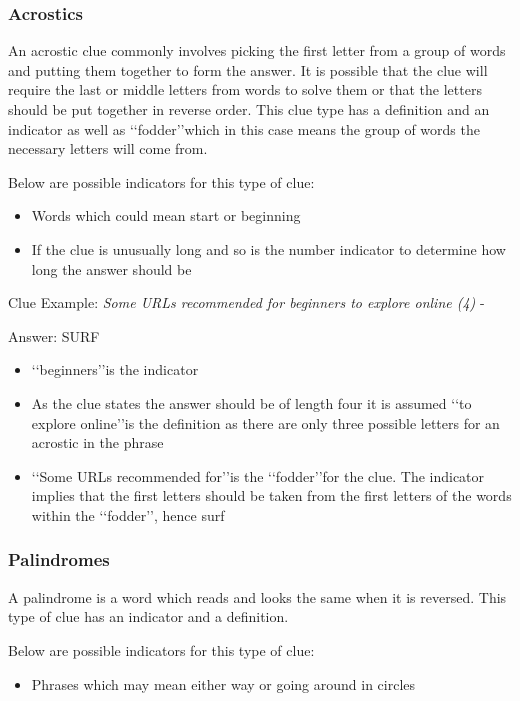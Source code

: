 \subsubsection{Acrostics}

An acrostic clue commonly involves picking the first letter from a group of words and putting them together to form the answer. It is possible that the clue will require the last or middle letters from words to solve them or that the letters should be put together in reverse order. This clue type has a definition and an indicator as well as \lq\lq fodder\rq\rq which in this case means the group of words the necessary letters will come from. 

Below are possible indicators for this type of clue:
\begin{itemize}
 	\item Words which could mean start or beginning 
	\item If the clue is unusually long and so is the number indicator to determine how long the answer should be 
\\
\end{itemize}

Clue Example: \emph{Some URLs recommended for beginners to explore online (4)} - \citep{shuchiAcrostics08}

Answer: SURF 

\begin{itemize}
	\item \lq\lq beginners\rq\rq is the indicator 
	\item As the clue states the answer should be of length four it is assumed \lq\lq to explore online\rq\rq is the definition as there are only three possible letters for an acrostic in the phrase 
	\item \lq\lq Some URLs recommended for\rq\rq is the \lq\lq fodder\rq\rq for the clue. The indicator implies that the first letters should be taken from the first letters of the words within the \lq\lq fodder\rq\rq, hence surf  
\end{itemize}
 
\subsubsection{Palindromes}

A palindrome is a word which reads and looks the same when it is reversed. This type of clue has an indicator and a definition. 

Below are possible indicators for this type of clue:
\begin{itemize} 
	\item Phrases which may mean either way or going around in circles
\\
\end{itemize}

